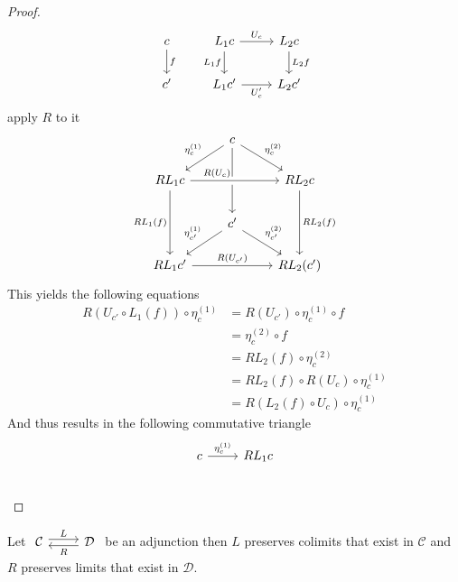 \begin{proof}
    \[
    \begin{tikzcd}
        c 
        \arrow[d, "f"]
        &
        L_1c
        \arrow[r, "U_c"]
        \arrow[d, "L_1f"']
        &
        L_2c
        \arrow[d, "L_2f"]
        \\
        c'
        &
        L_1c'
        \arrow[r, "U_c'"']
        &
        L_2c'
    \end{tikzcd}
    \]
    apply $R$ to it 
    \[
    \begin{tikzcd}
        &
        c
        \arrow[dl, "\eta^{(1)}_c"']
        \arrow[dr, "\eta^{(2)}_c"]
        \arrow[dd]
        &
        \\
        RL_1c
        \arrow[rr, crossing over, "R(U_c)", pos=0.3]
        \arrow[dd, "RL_1(f)"']
        &
        &
        RL_2c
        \arrow[dd,"RL_2(f)"]
        \\
        &
        c'
        \arrow[ld, "\eta_{c'}^{(1)}"']
        \arrow[rd, "\eta_{c'}^{(2)}"]
        &
        \\
        RL_1c'
        \arrow[rr, "R(U_{c'})"]
        &
        &
        RL_2(c')
    \end{tikzcd}
    \]
    This yields the following equations
    \begin{align}
        R(U_{c'} \circ L_1(f)) \circ \eta^{(1)}_c
        &= R (U_{c'}) \circ \eta_c^{(1)} \circ f
        \\
        &= \eta_c^{(2)} \circ f
        \\
        &=RL_2(f) \circ \eta_c^{(2)}
        \\
        &=RL_2(f) \circ R(U_c) \circ \eta_c^{(1)}
        \\
        &=R(L_2(f) \circ U_c) \circ \eta_c^{(1)}
    \end{align}
    And thus results in the following commutative triangle 
    \[
    \begin{tikzcd}
        c 
        \arrow[r, "\eta_c^{(1)}"]
        &
        RL_1c
        \\
    \end{tikzcd}
    \]
\end{proof}

\begin{prop}
    Let $\begin{tikzcd}
        \mathcal{C}
        \arrow[r, shift left, "L"]
        &
        \mathcal{D}
        \arrow[l, shift left, "R"]
    \end{tikzcd}$
    be an adjunction then $L$ preserves colimits that exist in $\mathcal{C}$ and $R$ preserves limits that exist in $\mathcal{D}$.
\end{prop}


